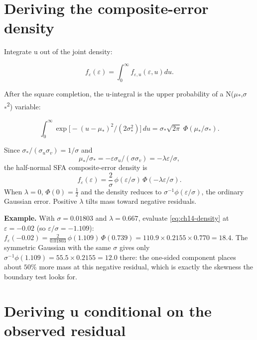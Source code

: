 \hypertarget{deriving-the-composite-error-density}{%
\section{Deriving the composite-error
density}\label{deriving-the-composite-error-density}}

Integrate u out of the joint density:

\begin{equation}
f_{\varepsilon}(\varepsilon )=\int _{0}^{\infty}f_{\varepsilon ,u}(\varepsilon ,u)du.
\end{equation}

After the square completion, the u-integral is the upper probability of
a N(\ensuremath{\mu }\textsubscript{*},\ensuremath{\sigma }\textsubscript{*}\textsuperscript{2}) variable:

\begin{equation}
\int _{0}^{\infty} \exp\!\bigl[-(u-\mu _{*})^{2}/(2\sigma _{*}^{2})\bigr]\,du = \sigma _{*}\sqrt{2\pi }\; \Phi (\mu _{*}/\sigma _{*}).
\end{equation}

Since $\sigma_{*}/(\sigma_{u}\sigma_{v})=1/\sigma$ and
\begin{equation}
\mu _{*}/\sigma _{*} = -\varepsilon \sigma _{u}/(\sigma \sigma _{v}) = -\lambda \varepsilon /\sigma ,
\end{equation}
the half-normal SFA composite-error density is
\begin{equation}\label{eq:ch14-density}
f_{\varepsilon}(\varepsilon ) = \frac{2}{\sigma}\,\phi (\varepsilon /\sigma )\,\Phi (-\lambda \varepsilon /\sigma ).
\end{equation}
When $\lambda=0$, $\Phi(0)=\tfrac12$ and the density reduces to
$\sigma^{-1}\phi(\varepsilon/\sigma)$, the ordinary Gaussian error. Positive
$\lambda$ tilts mass toward negative residuals.

\textbf{Example.} With $\sigma=0.01803$ and $\lambda=0.667$, evaluate
\eqref{eq:ch14-density} at $\varepsilon=-0.02$ (so $\varepsilon/\sigma=-1.109$):
$f_\varepsilon(-0.02)=\tfrac{2}{0.01803}\,\phi(1.109)\,\Phi(0.739)
=110.9\times0.2155\times0.770=18.4$. The symmetric Gaussian with the same
$\sigma$ gives only $\sigma^{-1}\phi(1.109)=55.5\times0.2155=12.0$ there:
the one-sided component places about $50\%$ more mass at this negative
residual, which is exactly the skewness the boundary test looks for.

\hypertarget{deriving-u-conditional-on-the-observed-residual}{%
\section{Deriving u conditional on the observed
residual}\label{deriving-u-conditional-on-the-observed-residual}}

